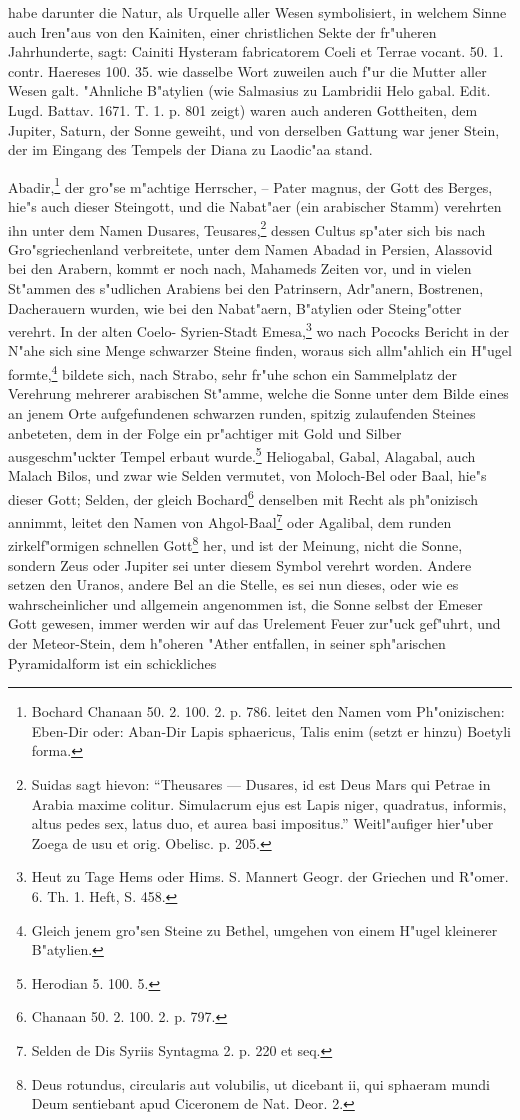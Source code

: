 \documentclass[a4paper, 11pt, oneside, polutonikogreek, german]{article}
\begin{document}
habe darunter die Natur, als Urquelle aller Wesen symbolisiert, in welchem Sinne auch Iren"aus von den Kainiten, einer christlichen Sekte der fr"uheren Jahrhunderte, sagt: Cainiti Hysteram fabricatorem Coeli et Terrae vocant. 50. 1. contr. Haereses 100. 35. wie dasselbe Wort zuweilen auch f"ur die Mutter aller Wesen galt. "Ahnliche B"atylien (wie Salmasius zu Lambridii Helo gabal. Edit. Lugd. Battav. 1671. T. 1. p. 801 zeigt) waren auch anderen Gottheiten, dem Jupiter, Saturn, der Sonne geweiht, und von derselben Gattung war jener Stein, der im Eingang des Tempels der Diana zu Laodic"aa stand.

Abadir,\footnote{Bochard Chanaan 50. 2. 100. 2. p. 786. leitet den Namen vom Ph"onizischen: Eben-Dir oder: Aban-Dir Lapis sphaericus, Talis enim (setzt er hinzu) Boetyli forma.} der gro"se m"achtige Herrscher, -- Pater magnus, der Gott des Berges, hie"s auch dieser Steingott, und die Nabat"aer (ein arabischer Stamm) verehrten ihn unter dem Namen Dusares, Teusares,\footnote{Suidas sagt hievon: "`Theusares --- Dusares, id est Deus Mars qui Petrae in Arabia maxime colitur. Simulacrum ejus est Lapis niger, quadratus, informis, altus pedes sex, latus duo, et aurea basi impositus."' Weitl"aufiger hier"uber Zoega de usu et orig. Obelisc. p. 205.} dessen Cultus sp"ater sich bis nach Gro"sgriechenland verbreitete, unter dem Namen Abadad in Persien, Alassovid bei den Arabern, kommt er noch nach, Mahameds Zeiten vor, und in vielen St"ammen des s"udlichen Arabiens bei den Patrinsern, Adr"anern, Bostrenen, Dacherauern wurden, wie bei den Nabat"aern, B"atylien oder Steing"otter verehrt. In der alten Coelo- Syrien-Stadt Emesa,\footnote{Heut zu Tage Hems oder Hims. S. Mannert Geogr. der Griechen und R"omer. 6. Th. 1. Heft, S. 458.} wo nach Pococks Bericht in der N"ahe sich sine Menge schwarzer Steine finden, woraus sich allm"ahlich ein H"ugel formte,\footnote{Gleich jenem gro"sen Steine zu Bethel, umgehen von einem H"ugel kleinerer B"atylien.} bildete sich, nach Strabo, sehr fr"uhe schon ein Sammelplatz der Verehrung mehrerer arabischen St"amme, welche die Sonne unter dem Bilde eines an jenem Orte aufgefundenen schwarzen runden, spitzig zulaufenden Steines anbeteten, dem in der Folge ein pr"achtiger mit Gold und Silber ausgeschm"uckter Tempel erbaut wurde.\footnote{Herodian 5. 100. 5.} Heliogabal, Gabal, Alagabal, auch Malach Bilos, und zwar wie Selden vermutet, von Moloch-Bel oder Baal, hie"s dieser Gott; Selden, der gleich Bochard\footnote{Chanaan 50. 2. 100. 2. p. 797.} denselben mit Recht als ph"onizisch annimmt, leitet den Namen von Ahgol-Baal\footnote{Selden de Dis Syriis Syntagma 2. p. 220 et seq.} oder Agalibal, dem runden zirkelf"ormigen schnellen Gott\footnote{Deus rotundus, circularis aut volubilis, ut dicebant ii, qui sphaeram mundi Deum sentiebant apud Ciceronem de Nat. Deor. 2.} her, und ist der Meinung, nicht die Sonne, sondern Zeus oder Jupiter sei unter diesem Symbol verehrt worden. Andere setzen den Uranos, andere Bel an die Stelle, es sei nun dieses, oder wie es wahrscheinlicher und allgemein angenommen ist, die Sonne selbst der Emeser Gott gewesen, immer werden wir auf das Urelement Feuer zur"uck gef"uhrt, und der Meteor-Stein, dem h"oheren "Ather entfallen, in seiner sph"arischen Pyramidalform ist ein schickliches 
\end{document}
